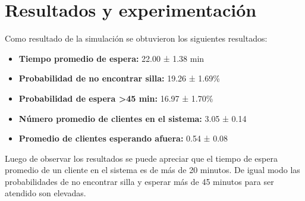 \documentclass{article}
\begin{document}
\section{Resultados y experimentación}
Como resultado de la simulación se obtuvieron los siguientes resultados:
\begin{itemize}
    \item \textbf{Tiempo promedio de espera:} 22.00 ± 1.38 min 
    \item \textbf{Probabilidad de no encontrar silla:} 19.26 ± 1.69\% 
    \item \textbf{Probabilidad de espera >45 min:} 16.97 ± 1.70\% 
    \item \textbf{Número promedio de clientes en el sistema:} 3.05 ± 0.14 
    \item \textbf{Promedio de clientes esperando afuera:} 0.54 ± 0.08 
\end{itemize}

Luego de observar los resultados se puede apreciar  que el tiempo de espera promedio de un cliente en el sistema es de más de 20 minutos. De igual modo las probabilidades de no encontrar silla y esperar más de 45 minutos para ser atendido son elevadas.
\end{document}
